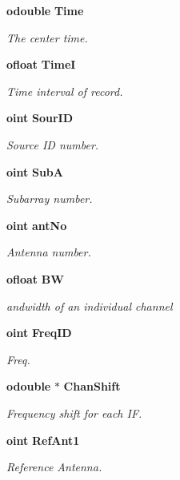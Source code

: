 \begin{CompactItemize}
{\bf odouble} {\bf Time}
\begin{CompactList}\small\item\em The center time. \item\end{CompactList}\item 
{\bf ofloat} {\bf Time\-I}
\begin{CompactList}\small\item\em Time interval of record. \item\end{CompactList}\item 
{\bf oint} {\bf Sour\-ID}
\begin{CompactList}\small\item\em Source ID number. \item\end{CompactList}\item 
{\bf oint} {\bf Sub\-A}
\begin{CompactList}\small\item\em Subarray number. \item\end{CompactList}\item 
{\bf oint} {\bf ant\-No}
\begin{CompactList}\small\item\em Antenna number. \item\end{CompactList}\item 
{\bf ofloat} {\bf BW}
\begin{CompactList}\small\item\em andwidth of an individual channel \item\end{CompactList}\item 
{\bf oint} {\bf Freq\-ID}
\begin{CompactList}\small\item\em Freq. \item\end{CompactList}\item 
{\bf odouble} $\ast$ {\bf Chan\-Shift}
\begin{CompactList}\small\item\em Frequency shift for each IF. \item\end{CompactList}\item 
{\bf oint} {\bf Ref\-Ant1}
\begin{CompactList}\small\item\em Reference Antenna. \item\end{CompactList}\item 

\end{CompactItemize}
